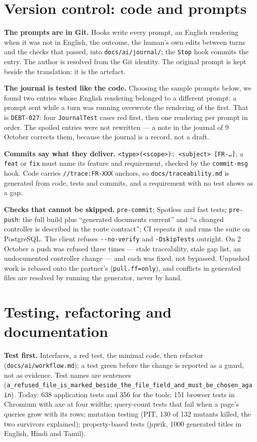 \documentclass[11pt]{article}
\begin{document}
\section{Version control: code and prompts}

\textbf{The prompts are in Git.} Hooks write every prompt, an English rendering when it was not in
English, the outcome, the human's own edits between turns and the checks that passed, into
\texttt{docs/ai/journal/}; the \texttt{Stop} hook commits the entry. The author is resolved from the
Git identity. The original prompt is kept beside the translation: it is the artefact.

\textbf{The journal is tested like the code.} Choosing the sample prompts below, we found two
entries whose English rendering belonged to a different prompt: a prompt sent while a turn was
running overwrote the rendering of the first. That is \texttt{DEBT-027}: four \texttt{JournalTest}
cases red first, then one rendering per prompt in order. The spoiled entries were not rewritten ---
a note in the journal of 9 October corrects them, because the journal is a record, not a draft.

\textbf{Commits say what they deliver.} \texttt{<type>(<scope>): <subject> [FR-\ldots]}; a
\texttt{feat} or \texttt{fix} must name its feature and requirement, checked by the
\texttt{commit-msg} hook. Code carries \texttt{//trace:FR-XXX} anchors, so
\texttt{docs/traceability.md} is generated from code, tests and commits, and a requirement with no
test shows as a gap.

\textbf{Checks that cannot be skipped.} \texttt{pre-commit}: Spotless and fast tests;
\texttt{pre-push}: the full build plus ``generated documents current'' and ``a changed controller is
described in the route contract''; CI repeats it and runs the suite on PostgreSQL. The client refuses
\texttt{-{}-no-verify} and \texttt{-DskipTests} outright. On 2 October a push was refused three times
--- stale traceability, stale gap list, an undocumented controller change --- and each was fixed,
not bypassed. Unpushed work is rebased onto the partner's (\texttt{pull.ff=only}), and conflicts in
generated files are resolved by running the generator, never by hand.

\section{Testing, refactoring and documentation}

\textbf{Test first.} Interfaces, a red test, the minimal code, then refactor
(\texttt{docs/ai/workflow.md}); a test green before the change is reported as a guard, not as
evidence. Test names are sentences
(\texttt{a\_refused\_file\_is\_marked\_beside\_the\_file\_field\_and\_must\_be\_chosen\_again}).
Today: 638 application tests and 356 for the tools; 151 browser tests in Chromium with axe
at four widths; query-count tests that fail when a page's queries grow with its rows; mutation testing
(PIT, 130 of 132 mutants killed, the two survivors explained); property-based tests (jqwik, 1000
generated titles in English, Hindi and Tamil).
\end{document}
